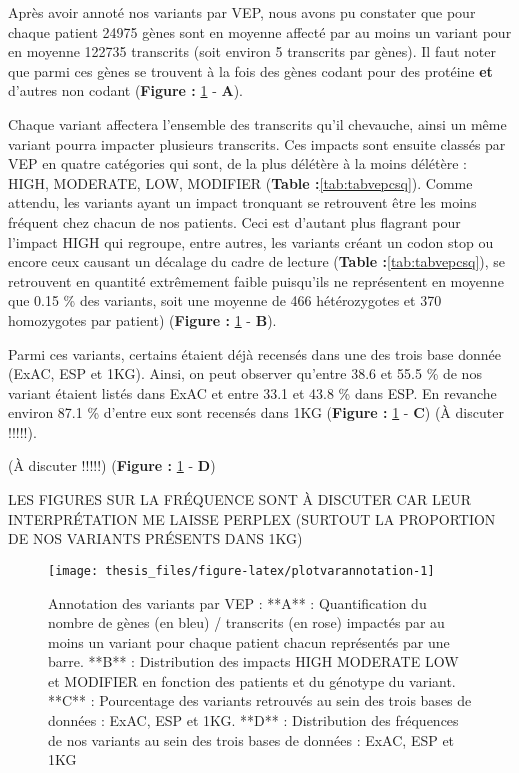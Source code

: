 \documentclass[12pt,twoside]{reedthesis}
\theoremstyle{definition}
\theoremstyle{definition}
\theoremstyle{remark}
\begin{document}
  Après avoir annoté nos variants par VEP, nous avons pu constater que
  pour chaque patient 24975 gènes sont en moyenne affecté par au moins un
  variant pour en moyenne 122735 transcrits (soit environ 5 transcrits par
  gènes). Il faut noter que parmi ces gènes se trouvent à la fois des
  gènes codant pour des protéine \textbf{et} d'autres non codant
  (\textbf{Figure : }\ref{fig:plotvarannotation} - \textbf{A}).
  
  Chaque variant affectera l'ensemble des transcrits qu'il chevauche,
  ainsi un même variant pourra impacter plusieurs transcrits. Ces impacts
  sont ensuite classés par VEP en quatre catégories qui sont, de la plus
  délétère à la moins délétère : HIGH, MODERATE, LOW, MODIFIER
  (\textbf{Table :}\ref{tab:tabvepcsq}). Comme attendu, les variants ayant
  un impact tronquant se retrouvent être les moins fréquent chez chacun de
  nos patients. Ceci est d'autant plus flagrant pour l'impact HIGH qui
  regroupe, entre autres, les variants créant un codon stop ou encore ceux
  causant un décalage du cadre de lecture (\textbf{Table
  :}\ref{tab:tabvepcsq}), se retrouvent en quantité extrêmement faible
  puisqu'ils ne représentent en moyenne que 0.15 \% des variants, soit une
  moyenne de 466 hétérozygotes et 370 homozygotes par patient)
  (\textbf{Figure : }\ref{fig:plotvarannotation} - \textbf{B}).
  
  Parmi ces variants, certains étaient déjà recensés dans une des trois
  base donnée (ExAC, ESP et 1KG). Ainsi, on peut observer qu'entre 38.6 et
  55.5 \% de nos variant étaient listés dans ExAC et entre 33.1 et 43.8 \%
  dans ESP. En revanche environ 87.1 \% d'entre eux sont recensés dans 1KG
  (\textbf{Figure : }\ref{fig:plotvarannotation} - \textbf{C}) (À discuter
  !!!!!).
  
  (À discuter !!!!!) (\textbf{Figure : }\ref{fig:plotvarannotation} -
  \textbf{D})
  
  LES FIGURES SUR LA FRÉQUENCE SONT À DISCUTER CAR LEUR INTERPRÉTATION ME
  LAISSE PERPLEX (SURTOUT LA PROPORTION DE NOS VARIANTS PRÉSENTS DANS 1KG)
  
  \newpage
  
  \begin{figure}
  
  {\centering \texttt{[image: thesis\_files/figure-latex/plotvarannotation-1]} 
  
  }
  
  \caption[Annotation des variants par VEP]{Annotation des variants par VEP : **A** : Quantification du nombre de gènes (en bleu) / transcrits (en rose) impactés par au moins un variant pour chaque patient chacun représentés par une barre. **B** : Distribution des impacts HIGH MODERATE LOW et MODIFIER en fonction des patients et du génotype du variant. **C** : Pourcentage des variants retrouvés au sein des trois bases de données : ExAC, ESP et 1KG. **D** : Distribution des fréquences de nos variants au sein des trois bases de données : ExAC, ESP et 1KG}\label{fig:plotvarannotation}
  \end{figure}
  
\end{document}
